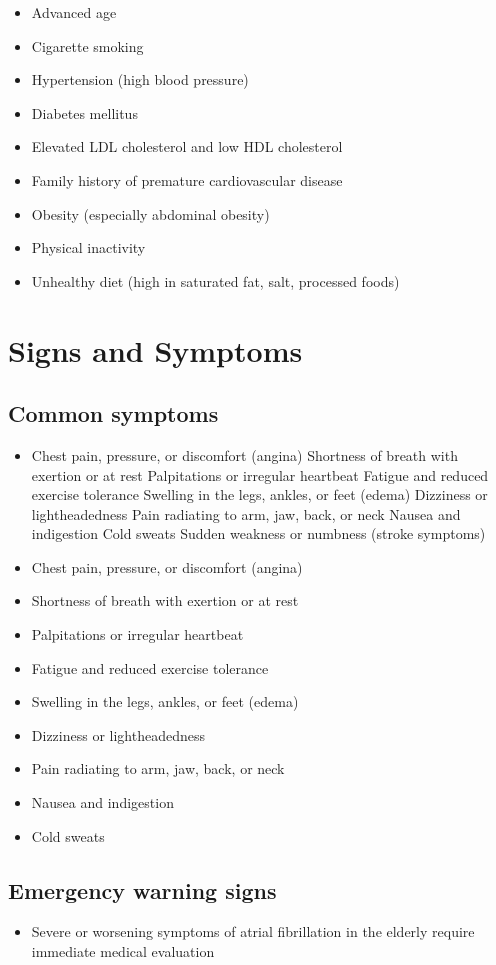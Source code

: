 \begin{itemize}[noitemsep]
  \item Advanced age
  \item Cigarette smoking
  \item Hypertension (high blood pressure)
  \item Diabetes mellitus
  \item Elevated LDL cholesterol and low HDL cholesterol
  \item Family history of premature cardiovascular disease
  \item Obesity (especially abdominal obesity)
  \item Physical inactivity
  \item Unhealthy diet (high in saturated fat, salt, processed foods)
\end{itemize}
\section{Signs and Symptoms}

\subsection{Common symptoms}
\begin{itemize}[noitemsep]
  \item Chest pain, pressure, or discomfort (angina) Shortness of breath with exertion or at rest Palpitations or irregular heartbeat Fatigue and reduced exercise tolerance Swelling in the legs, ankles, or feet (edema) Dizziness or lightheadedness Pain radiating to arm, jaw, back, or neck Nausea and indigestion Cold sweats Sudden weakness or numbness (stroke symptoms)
  \item Chest pain, pressure, or discomfort (angina)
  \item Shortness of breath with exertion or at rest
  \item Palpitations or irregular heartbeat
  \item Fatigue and reduced exercise tolerance
  \item Swelling in the legs, ankles, or feet (edema)
  \item Dizziness or lightheadedness
  \item Pain radiating to arm, jaw, back, or neck
  \item Nausea and indigestion
  \item Cold sweats
\end{itemize}

\subsection{Emergency warning signs}
\begin{itemize}[noitemsep]
  \item Severe or worsening symptoms of atrial fibrillation in the elderly require immediate medical evaluation
\end{itemize}
